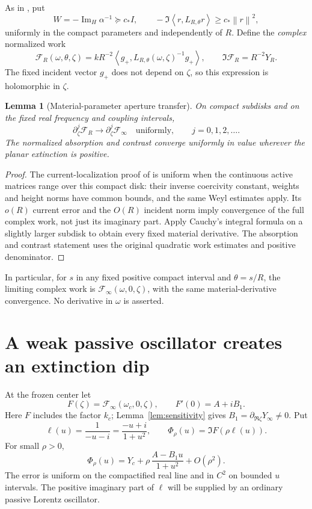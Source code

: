 \documentclass[11pt]{article}
\newtheorem{lemma}{Lemma}
\newcommand{\ImH}{\operatorname{Im}_{H}}
\newcommand{\norm}[1]{\left\lVert#1\right\rVert}
\newcommand{\ip}[2]{\left\langle#1,#2\right\rangle}
\begin{document}
As in \cite{strict}, put
\[
 W=-\ImH\alpha^{-1}\succeq c_*I,\qquad
 -\Im\ip r{L_{R,\theta}r}\ge c_*\norm r^2 ,
\]
uniformly in the compact parameters and independently of $R$.
Define the \emph{complex} normalized work
\[
 \mathcal F_R(\omega,\theta,\zeta)
 =kR^{-2}\ip{g_+}{L_{R,\theta}(\omega,\zeta)^{-1}g_+},
 \qquad
 \Im\mathcal F_R=R^{-2}Y_R.
\]
The fixed incident vector $g_+$ does not depend on $\zeta$, so this expression
is holomorphic in $\zeta$.

\begin{lemma}[Material-parameter aperture transfer]\label{lem:cauchy}
On compact subdisks and on the fixed real frequency and coupling intervals,
\[
 \partial_\zeta^j\mathcal F_R
   \longrightarrow\partial_\zeta^j\mathcal F_\infty
 \quad\text{uniformly},\qquad j=0,1,2,\ldots .
\]
The normalized absorption and contrast converge uniformly in value wherever
the planar extinction is positive.
\end{lemma}
\begin{proof}
The current-localization proof of \cite{strict} is uniform when the continuous
active matrices range over this compact disk: their inverse coercivity
constant, weights and height norms have common bounds, and the same Weyl
estimates apply. Its $o(R)$ current error and the $O(R)$ incident norm imply
convergence of the full complex work, not just its imaginary part.
Apply Cauchy's integral formula on a slightly larger subdisk to obtain every
fixed material derivative. The absorption and contrast statement uses the
original quadratic work estimates and positive denominator.
\end{proof}

In particular, for $s$ in any fixed positive compact interval and
$\theta=s/R$, the limiting complex work is
$\mathcal F_\infty(\omega,0,\zeta)$, with the same material-derivative
convergence. No derivative in $\omega$ is asserted.

\section{A weak passive oscillator creates an extinction dip}
At the frozen center let
\[
 F(\zeta)=\mathcal F_\infty(\omega_c,0,\zeta),\qquad
 F'(0)=A+iB_1 .
\]
Here $F$ includes the factor $k_c$; Lemma~\ref{lem:sensitivity} gives
$B_1=\partial_{\Re\zeta}Y_\infty\ne0$.
Put
\[
 \ell(u)=\frac1{-u-i}=\frac{-u+i}{1+u^2},\qquad
 \Phi_\rho(u)=\Im F(\rho\ell(u)).
\]
For small $\rho>0$,
\begin{equation}\label{eq:fano}
 \Phi_\rho(u)=Y_c+
       \rho\,\frac{A-B_1u}{1+u^2}+O(\rho^2).
\end{equation}
The error is uniform on the compactified real line and in $C^2$ on bounded
$u$ intervals. The positive imaginary part of $\ell$ will be supplied by an
ordinary passive Lorentz oscillator.
\end{document}
